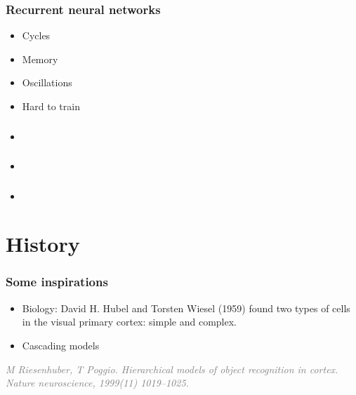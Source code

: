 \documentclass[t]{beamer}
\newcommand\smallgray[1]{\textcolor{gray}{\small\it #1}}
\newcommand\prevwork[1]{\smallgray{#1}}
\begin{document}
\begin{frame}
  \frametitle{Recurrent neural networks}
  \begin{itemize}
  \item Cycles
  \item Memory
  \item Oscillations
  \item Hard to train
  \end{itemize}
\end{frame}

\begin{frame}
  \frametitle{}
  \begin{itemize}
  \item 
  \end{itemize}
\end{frame}

\begin{frame}
  \frametitle{}
  \begin{itemize}
  \item 
  \end{itemize}
\end{frame}

\begin{frame}
  \frametitle{}
  \begin{itemize}
  \item 
  \end{itemize}
\end{frame}

\section{History}

\begin{frame}
  \frametitle{Some inspirations}
  \begin{itemize}
  \item Biology: David H. Hubel and Torsten Wiesel (1959) found two
    types of cells in the visual primary cortex: simple and complex.
  \item Cascading models
  \end{itemize}

  \prevwork{M Riesenhuber, T Poggio. Hierarchical models of object
    recognition in cortex. Nature neuroscience, 1999(11) 1019–1025.}
\end{frame}
\end{document}

